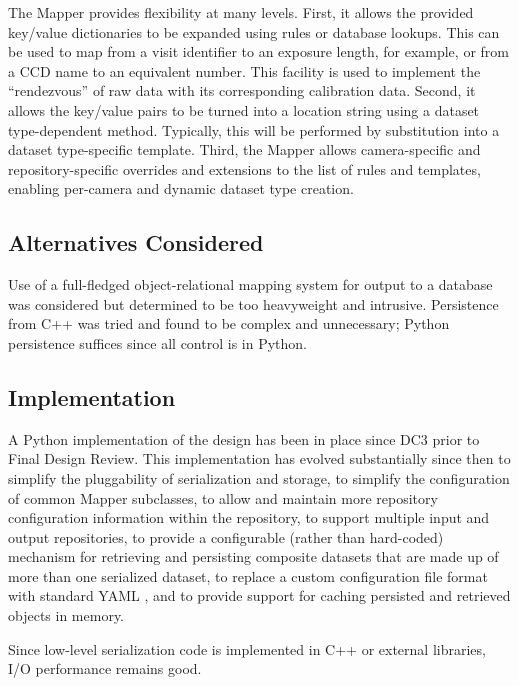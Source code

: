 \documentclass[DM,lsstdraft,toc]{lsstdoc}
\begin{document}
The Mapper provides flexibility at many levels. First, it allows the
provided key/value dictionaries to be expanded using rules or database
lookups. This can be used to map from a visit identifier to an exposure
length, for example, or from a CCD name to an equivalent number. This
facility is used to implement the ``rendezvous'' of raw data with its
corresponding calibration data. Second, it allows the key/value pairs to
be turned into a location string using a dataset type-dependent method.
Typically, this will be performed by substitution into a dataset
type-specific template. Third, the Mapper allows camera-specific and
repository-specific overrides and extensions to the list of rules and
templates, enabling per-camera and dynamic dataset type creation.

\subsection{Alternatives Considered}\label{alternatives-considered}

Use of a full-fledged object-relational mapping system for output to a
database was considered but determined to be too heavyweight and
intrusive. Persistence from C++ was tried and found to be complex and
unnecessary; Python persistence suffices since all control is in Python.

\subsection{Implementation}\label{butler-implementation}

A Python implementation of the design has been in place since DC3 prior to
Final Design Review.  This implementation has evolved substantially since then
to simplify the pluggability of serialization and storage, to simplify the
configuration of common Mapper subclasses, to allow and maintain more
repository configuration information within the repository, to support multiple
input and output repositories, to provide a configurable (rather than
hard-coded) mechanism for retrieving and persisting composite datasets that are
made up of more than one serialized dataset, to replace a custom configuration
file format with standard YAML \citep{YAML}, and to provide support for caching
persisted and retrieved objects in memory.

Since low-level serialization code is implemented in C++ or external libraries,
I/O performance remains good.


\end{document}
